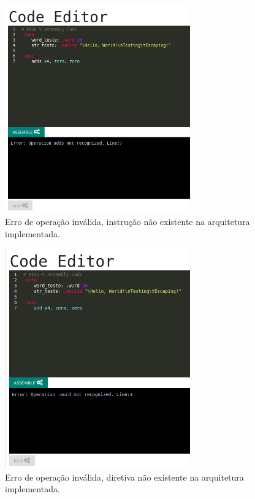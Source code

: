 	\begin{figure}[h]
	  \centering
	  \includegraphics[width=8cm]{img/assemble_error_operation_not_recognized.png}
	  \caption{Erro de operação inválida, instrução não existente na arquitetura implementada.}
	  \label{fig:assemble_error_operation_not_recognized}
	\end{figure}


	\begin{figure}[h]
	  \centering
	  \includegraphics[width=8cm]{img/assemble_error_op_not_recog_directives.png}
	  \caption{Erro de operação inválida, diretiva não existente na arquitetura implementada.}
	  \label{fig:assemble_error_op_not_recog_directives}
	\end{figure}

